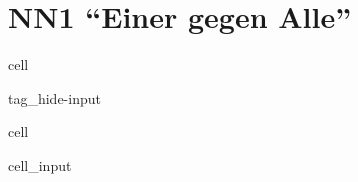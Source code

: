 \documentclass[letterpaper,10pt,english]{jupyterBook}
\begin{document}
\chapter{NN1 “Einer gegen Alle”}
\label{\detokenize{02_NN/NeuralNet_1_Keras:nn1-einer-gegen-alle}}\label{\detokenize{02_NN/NeuralNet_1_Keras::doc}}
\begin{sphinxuseclass}{cell}
\begin{sphinxuseclass}{tag_hide-input}
\end{sphinxuseclass}
\end{sphinxuseclass}
\begin{sphinxuseclass}{cell}\begin{sphinxVerbatimInput}

\begin{sphinxuseclass}{cell_input}
\begin{sphinxVerbatim}[commandchars=\\\{\}]
   
   
   
 
   
\end{sphinxVerbatim}

\end{sphinxuseclass}\end{sphinxVerbatimInput}
\begin{sphinxVerbatimOutput}


\end{sphinxVerbatimOutput}
\end{sphinxuseclass}
\end{document}
